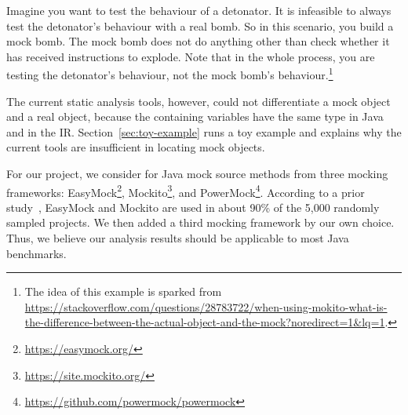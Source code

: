 Imagine you want to test the behaviour of a detonator. It is infeasible to always test the detonator's behaviour with a real bomb. So in this scenario, you build a mock bomb. The mock bomb does not do anything other than check whether it has received instructions to explode. Note that in the whole process, you are testing the detonator's behaviour, not the mock bomb's behaviour.\footnote{The idea of this example is sparked from \url{https://stackoverflow.com/questions/28783722/when-using-mokito-what-is-the-difference-between-the-actual-object-and-the-mock?noredirect=1&lq=1}.}

The current static analysis tools, however, could not differentiate a mock object and a real object, because the containing variables have the same type in Java and in the IR. Section~\ref{sec:toy-example} runs a toy example and explains why the current tools are insufficient in locating mock objects.

For our project, we consider for Java mock source methods from three mocking frameworks: EasyMock\footnote{\url{https://easymock.org/}}, Mockito\footnote{\url{https://site.mockito.org/}}, and PowerMock\footnote{\url{https://github.com/powermock/powermock}}. According to a prior study~\cite{mostafa14:_empirical_study_mock_frameworks}, EasyMock and Mockito are used in about 90\% of the 5,000 randomly sampled projects. We then added a third mocking framework by our own choice. Thus, we believe our analysis results should be applicable to most Java benchmarks. 